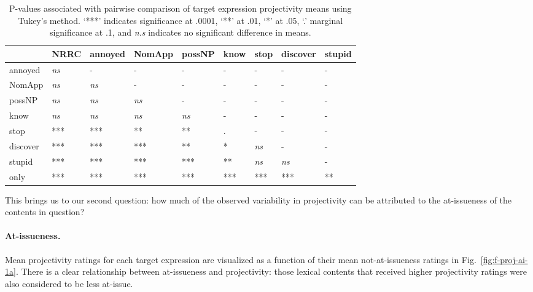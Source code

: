 \documentclass[11pt,fleqn]{article}
\newcommand{\6}{\mbox{$[\hspace*{-.6mm}[$}}
\newcommand{\9}{\mbox{$]\hspace*{-.6mm}]$}}
\newcommand{\figref}[1]{Fig.~\ref{#1}}
\begin{document}
\begin{table}[!h]
\caption{P-values associated with pairwise comparison of target expression projectivity means using Tukey's method. `***' indicates significance at .0001, `**' at .01, `*' at .05, `.' marginal significance at .1, and \emph{n.s} indicates no significant difference in means.}
\begin{center}
\begin{tabular}{l l l l l l l l l}
\toprule
 &   NRRC & annoyed & NomApp &  possNP &  know & stop & discover & stupid \\
 \midrule
annoyed &  \emph{ns}  &  -  &        -   &       -  &        -  &   - &     -   &  -\\     
NomApp  &  \emph{ns} & \emph{ns} & -    &   -   &    -    &   -  &     -   & - \\    
possNP  &    \emph{ns} & \emph{ns} & \emph{ns} & - &      -  &     -     &  -   & - \\    
know     &   \emph{ns} & \emph{ns} & \emph{ns} & \emph{ns} & -   &    -   &    -       & -\\
stop     &   *** & *** & ** & ** & . & - &  - & -\\      
discover  &   *** & *** & *** & ** & * & \emph{ns} & - & -      \\
stupid    &  *** & *** & *** & *** & ** & \emph{ns} & \emph{ns} & - \\
only      &  *** & *** & *** & *** & *** & *** & *** & ** \\
\bottomrule
\end{tabular}
\label{tab:pairwise}
\end{center}
\end{table}

This brings us to our second question: how much of the observed  variability in projectivity can be attributed to the at-issueness of the  contents in question?

\paragraph{At-issueness.} Mean projectivity ratings for each target expression are visualized as a function of their mean not-at-issueness ratings in \figref{fig:f-proj-ai-1a}. There is a clear relationship between at-issueness and projectivity: those lexical contents that received higher projectivity ratings were also considered to be less at-issue. 
\end{document}
